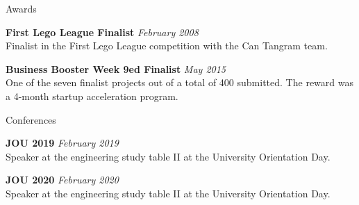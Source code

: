 \documentclass{resume} %
\begin{document}
\begin{rSection}{Awards}

    {\bf  First Lego League Finalist} \hfill {\em February 2008} \\ 
    Finalist in the First Lego League competition with the Can Tangram team.

    {\bf  Business Booster Week 9ed Finalist} \hfill {\em May 2015} \\ 
    One of the seven finalist projects out of a total of 400 submitted. The reward was a 4-month startup acceleration program.
    
\end{rSection}


\begin{rSection}{Conferences}

    {\bf  JOU 2019} \hfill {\em February 2019} \\ 
    Speaker at the engineering study table II at the University Orientation Day.

    {\bf  JOU 2020} \hfill {\em February 2020} \\ 
    Speaker at the engineering study table II at the University Orientation Day.
    
\end{rSection}





\end{document}
